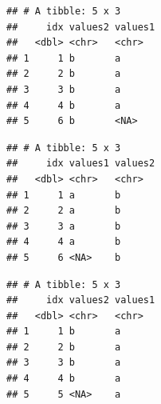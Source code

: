 \documentclass[krantz2]{krantz}\usepackage{knitr}
\begin{document}
\begin{knitrout}\footnotesize
{}\color{fgcolor}\begin{kframe}
\begin{alltt}
\hlstd{(}   
\end{alltt}


{\ttfamily\noindent\itshape{}}\begin{verbatim}
## # A tibble: 5 x 3
##     idx values2 values1
##   <dbl> <chr>   <chr>  
## 1     1 b       a      
## 2     2 b       a      
## 3     3 b       a      
## 4     4 b       a      
## 5     6 b       <NA>
\end{verbatim}
\end{kframe}
\end{knitrout}

\begin{knitrout}\footnotesize
{}\color{fgcolor}\begin{kframe}
\begin{alltt}
\hlstd{(}   
\end{alltt}


{\ttfamily\noindent\itshape{}}\begin{verbatim}
## # A tibble: 5 x 3
##     idx values1 values2
##   <dbl> <chr>   <chr>  
## 1     1 a       b      
## 2     2 a       b      
## 3     3 a       b      
## 4     4 a       b      
## 5     6 <NA>    b
\end{verbatim}
\end{kframe}
\end{knitrout}

\begin{knitrout}\footnotesize
{}\color{fgcolor}\begin{kframe}
\begin{alltt}
\hlstd{(}   
\end{alltt}


{\ttfamily\noindent\itshape{}}\begin{verbatim}
## # A tibble: 5 x 3
##     idx values2 values1
##   <dbl> <chr>   <chr>  
## 1     1 b       a      
## 2     2 b       a      
## 3     3 b       a      
## 4     4 b       a      
## 5     5 <NA>    a
\end{verbatim}
\end{kframe}
\end{knitrout}
\end{document}

